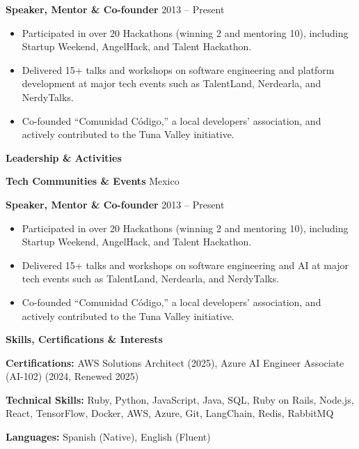 \documentclass[11pt]{article}
\begin{document}
{\textbf{Speaker, Mentor \& Co-founder} \hfill 2013 – Present
\begin{itemize}[noitemsep, topsep=0pt, partopsep=0pt, parsep=0pt]
    \item Participated in over 20 Hackathons (winning 2 and mentoring 10), including Startup Weekend, AngelHack, and Talent Hackathon.
    \item Delivered 15+ talks and workshops on software engineering and platform development at major tech events such as TalentLand, Nerdearla, and NerdyTalks.
    \item Co-founded ``Comunidad Código,'' a local developers' association, and actively contributed to the Tuna Valley initiative.
\end{itemize}
}{
\begin{center}
    \textbf{Leadership \& Activities}
\end{center}

\textbf{Tech Communities \& Events}	\hfill Mexico

\textbf{Speaker, Mentor \& Co-founder} \hfill 2013 – Present
\begin{itemize}[noitemsep, topsep=0pt, partopsep=0pt, parsep=0pt]
    \item Participated in over 20 Hackathons (winning 2 and mentoring 10), including Startup Weekend, AngelHack, and Talent Hackathon.
    \item Delivered 15+ talks and workshops on software engineering and AI at major tech events such as TalentLand, Nerdearla, and NerdyTalks.
    \item Co-founded ``Comunidad Código,'' a local developers' association, and actively contributed to the Tuna Valley initiative.
\end{itemize}
}

\vspace{12pt}

\begin{center}
    \textbf{Skills, Certifications \& Interests}
\end{center}

\textbf{Certifications:} AWS Solutions Architect (2025), Azure AI Engineer Associate (AI-102) (2024, Renewed 2025)

\textbf{Technical Skills:} Ruby, Python, JavaScript, Java, SQL, Ruby on Rails, Node.js, React, TensorFlow, Docker, AWS, Azure, Git, LangChain, Redis, RabbitMQ

\textbf{Languages:} Spanish (Native), English (Fluent)
\end{document}
